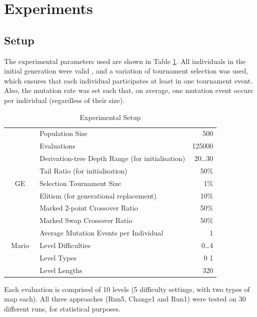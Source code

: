 \documentclass[conference]{IEEEtran}
\begin{document}
\section{Experiments}

\subsection{Setup}

The experimental parameters used are shown in Table \ref{tab:gesetup}. All
individuals in the initial generation were valid \cite{RA03}, and
a variation of tournament selection was used, which ensures that each
individual participates at least in one tournament event. Also, the mutation
rate was set such that, on average, one mutation event occurs per
individual (regardless of their size).

\begin{table}[ht]
	\begin{center}
	\caption{Experimental Setup}
	\label{tab:gesetup}
	\begin{tabular}{|c|l|r|}
		\hline
		&Population Size & 500\\
		&Evaluations     & 125000\\
		&Derivation-tree Depth Range (for initialisation) & 20\ldots30\\
		&Tail Ratio (for initialisation) & 50\%\\
		GE&Selection Tournament Size & 1\%\\
		&Elitism (for generational replacement) & 10\%\\
		&Marked 2-point Crossover Ratio & 50\%\\
		&Marked Swap Crossover Ratio & 50\%\\
		&Average Mutation Events per Individual & 1\\
		\hline
		\ Mario\ &Level Difficulties & 0\ldots4 \\
		&Level Types & 0 1 \\
		&Level Lengths & 320\\
		\hline
	\end{tabular}
	\end{center}
\end{table}

Each evaluation is comprised of 10 levels (5 difficulty settings, with two
types of map each). All three approaches (Run5, Change1 and Run1) were tested on
30 different runs, for statistical purposes.
\end{document}
